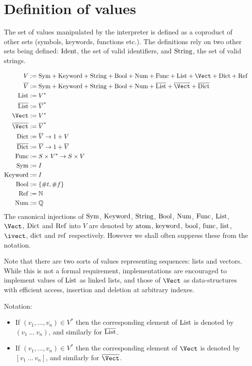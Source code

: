 \section{Definition of \rad{} values}
\label{value-definition}

The set of values manipulated by the \rad{} interpreter is defined as a coproduct
of other sets (symbols, keywords, functions etc.). The definitions rely on two
other sets being defined: $\mathrm{Ident}$, the set of valid identifiers, and $\mathrm{String}$,
the set of valid strings. 

\begin{align*}
  V &:= \Sym + \Keyword + \String + \Bool + \Num + \Func + \List + \Vect + \Dict + \Ref\\
  \overline{V} &:= \Sym + \Keyword + \String + \Bool + \Num + \overline{\List} + \overline{\Vect} + \overline{\Dict}\\
  \List &:= V^*\\
  \overline{\List} &:= \overline{V}^*\\
  \Vect &:= V^*\\
  \overline{\Vect} &:= \overline{V}^*\\
  \Dict &:= \overline{V} \to 1 + V\\
  \overline{\Dict} &:= \overline{V} \to 1 + \overline{V}\\
  \Func &:= S \times V^* \to S \times V\\
  \Sym &:= I\\
  \Keyword &:= I\\
  \Bool &:= \{\#t, \#f\}\\
  \Ref &:= \mathbb{N}\\
  \Num &:= \mathbb{Q}
\end{align*}
The canonical injections of $\mathrm{Sym}$, $\mathrm{Keyword}$, $\mathrm{String}$, $\mathrm{Bool}$, $\mathrm{Num}$,
$\mathrm{Func}$, $\mathrm{List}$, $\Vect$, $\mathrm{Dict}$ and $\mathrm{Ref}$ into $V$ are denoted by $\mathrm{atom}$,
$\mathrm{keyword}$, $\mathrm{bool}$, $\mathrm{func}$, $\mathrm{list}$, $\ivect$, $\mathrm{dict}$ and $\mathrm{ref}$ respectively.
However we shall often suppress these from the notation.

Note that there are two sorts of values representing sequences: lists and
vectors. While this is not a formal requirement, implementations are encouraged
to implement values of $\mathrm{List}$ as linked lists, and those of $\Vect$ as
data-structures with efficient access, insertion and deletion at arbitrary
indexes.

Notation:
\begin{itemize}
  \item If $(v_1, \ldots, v_n) \in V^*$ then the corresponding element of
    $\mathrm{List}$ is denoted by $(v_1 \ \ldots \ v_n)$, and similarly for
    $\overline{\mathrm{List}}$.
  \item If $(v_1, \ldots, v_n) \in V^*$ then the corresponding element of
    $\Vect$ is denoted by $[v_1 \ \ldots \ v_n]$, and similarly for $\overline{\Vect}$.
\end{itemize}